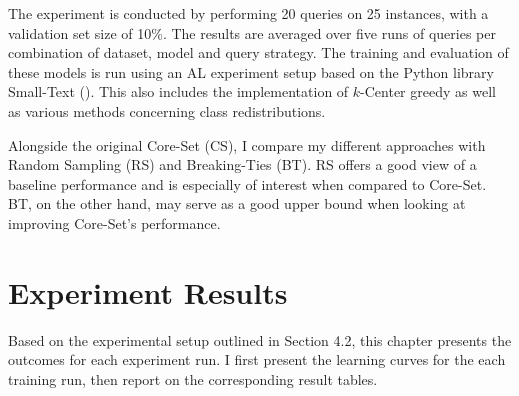 \documentclass[english,bachelor,ul]{webisthesis} %
\begin{document}
The experiment is conducted by performing 20 queries on 25 instances, with a validation set size of 10\%. The results are averaged over five runs of queries per combination of dataset, model and query strategy. The training and evaluation of these models is run using an AL experiment setup based on the Python library Small-Text (\cite{schroeder2023small-text}). This also includes the implementation of $k$-Center greedy as well as various methods concerning class redistributions.

Alongside the original Core-Set (CS), I compare my different approaches with Random Sampling (RS) and Breaking-Ties (BT). RS offers a good view of a baseline performance and is especially of interest when compared to Core-Set. BT, on the other hand, may serve as a good upper bound when looking at improving Core-Set's performance.

\section{Experiment Results}

Based on the experimental setup outlined in Section 4.2, this chapter presents the outcomes for each experiment run. I first present the learning curves for the each training run, then report on the corresponding result tables.
\end{document}
